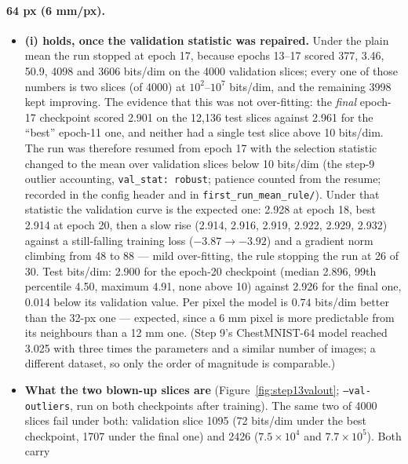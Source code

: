 \documentclass[11pt]{article}
\begin{document}
\paragraph{64 px (6 mm/px).}
\begin{itemize}
  \item \textbf{(i) holds, once the validation statistic was repaired.}
        Under the plain mean the run stopped at epoch 17, because epochs
        13--17 scored 377, 3.46, 50.9, 4098 and 3606 bits/dim on the 4000
        validation slices; every one of those numbers is two slices (of
        4000) at $10^{2}$--$10^{7}$ bits/dim, and the remaining 3998 kept
        improving. The evidence that this was not over-fitting: the
        \emph{final} epoch-17 checkpoint scored 2.901 on the 12,136 test
        slices against 2.961 for the ``best'' epoch-11 one, and neither had
        a single test slice above 10 bits/dim. The run was therefore
        resumed from epoch 17 with the selection statistic changed to the
        mean over validation slices below 10 bits/dim (the step-9 outlier
        accounting, \texttt{val\_stat: robust}; patience counted from the
        resume; recorded in the config header and in
        \texttt{first\_run\_mean\_rule/}). Under that statistic the
        validation curve is the expected one: 2.928 at epoch 18, best 2.914
        at epoch 20, then a slow rise (2.914, 2.916, 2.919, 2.922, 2.929,
        2.932) against a still-falling training loss ($-3.87 \to -3.92$) and
        a gradient norm climbing from 48 to 88 --- mild over-fitting, the
        rule stopping the run at 26 of 30. Test bits/dim: 2.900 for the
        epoch-20 checkpoint (median 2.896, 99th percentile 4.50, maximum
        4.91, none above 10) against 2.926 for the final one, 0.014 below
        its validation value. Per pixel the model is $0.74$ bits/dim better
        than the 32-px one --- expected, since a 6 mm pixel is more
        predictable from its neighbours than a 12 mm one. (Step 9's
        ChestMNIST-64 model reached 3.025 with three times the parameters
        and a similar number of images; a different dataset, so only the
        order of magnitude is comparable.)
  \item \textbf{What the two blown-up slices are} (Figure~\ref{fig:step13valout};
        \texttt{--val-outliers}, run on both checkpoints after training).
        The same two of 4000 slices fail under both: validation slice 1095
        (72 bits/dim under the best checkpoint, 1707 under the final one)
        and 2426 ($7.5 \times 10^{4}$ and $7.7 \times 10^{5}$). Both carry

\end{itemize}
\end{document}
